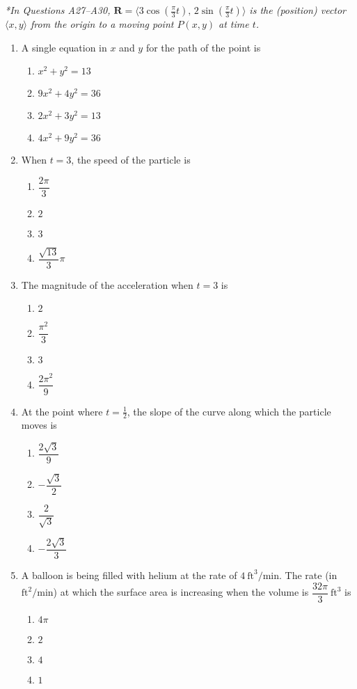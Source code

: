 \documentclass[12pt]{article}
\begin{document}
\medskip\noindent\textit{*In Questions A27–A30, $\mathbf R=\langle 3\cos(\tfrac{\pi}{3}t),\,2\sin(\tfrac{\pi}{3}t)\rangle$ is the (position) vector $\langle x,y\rangle$ from the origin to a moving point $P(x,y)$ at time $t$.}

\begin{enumerate}[label=\textbf{A\arabic*.},resume]

\item A single equation in $x$ and $y$ for the path of the point is
\begin{enumerate}[label=(\Alph*)]
\item $x^{2}+y^{2}=13$
\item $9x^{2}+4y^{2}=36$
\item $2x^{2}+3y^{2}=13$
\item $4x^{2}+9y^{2}=36$
\end{enumerate}

\item When $t=3$, the speed of the particle is
\begin{enumerate}[label=(\Alph*)]
\item $\dfrac{2\pi}{3}$ \item $2$ \item $3$ \item $\dfrac{\sqrt{13}}{3}\pi$
\end{enumerate}

\item The magnitude of the acceleration when $t=3$ is
\begin{enumerate}[label=(\Alph*)]
\item $2$ \item $\dfrac{\pi^{2}}{3}$ \item $3$ \item $\dfrac{2\pi^{2}}{9}$
\end{enumerate}

\item At the point where $t=\tfrac12$, the slope of the curve along which the particle moves is
\begin{enumerate}[label=(\Alph*)]
\item $\dfrac{2\sqrt3}{9}$ \item $-\dfrac{\sqrt3}{2}$ \item $\dfrac{2}{\sqrt3}$ \item $-\dfrac{2\sqrt3}{3}$
\end{enumerate}

\item A balloon is being filled with helium at the rate of $4\ \text{ft}^{3}/\text{min}$. The rate (in $\text{ft}^{2}/\text{min}$) at which the surface area is increasing when the volume is $\dfrac{32\pi}{3}\ \text{ft}^{3}$ is
\begin{enumerate}[label=(\Alph*)]
\item $4\pi$ \item $2$ \item $4$ \item $1$
\end{enumerate}


\end{enumerate}
\end{document}
